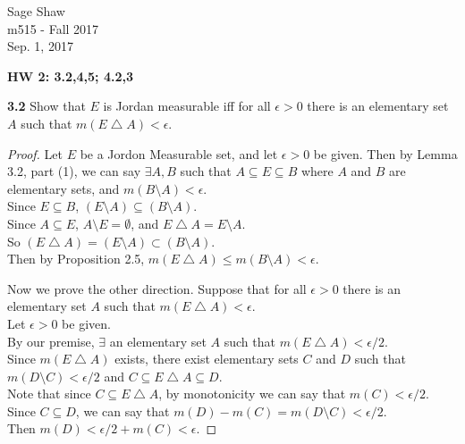 \documentclass[12pt]{article}
\begin{document}
	\thispagestyle{empty}
	
\begin{flushright}
	Sage Shaw \\
	m515 - Fall 2017 \\
	Sep. 1, 2017
\end{flushright}
	
{\large \textbf{HW 2: 3.2,4,5; 4.2,3}}\bigbreak

\hspace{-4 ex}\textbf{3.2} Show that $E$ is Jordan measurable iff for all $\epsilon>0$ there is an elementary set $A$ such that $m(E\bigtriangleup A)<\epsilon$. \bigbreak

	\begin{proof}
		Let $E$ be a Jordon Measurable set, and let $\epsilon >0$ be given. Then by Lemma 3.2, part (1), we can say $\exists A,B$ such that $A \subseteq E \subseteq B$ where $A$ and $B$ are elementary sets, and $m(B\setminus A)< \epsilon$. \\
		Since $E \subseteq B$, $(E \setminus A) \subseteq (B \setminus A)$. \\
		Since $A \subseteq E$, $A \setminus E = \emptyset$, and $E \bigtriangleup A = E \setminus A$. \\ 
		So $(E \bigtriangleup A) = (E \setminus A) \subset (B \setminus A)$.\\
		Then by Proposition 2.5, $m(E \bigtriangleup A) \leq m(B \setminus A) < \epsilon$.\bigbreak
		
		Now we prove the other direction. Suppose that for all $\epsilon>0$ there is an elementary set $A$ such that $m(E\bigtriangleup A)<\epsilon$.\\
		
		Let $\epsilon > 0$ be given. \\
		By our premise, $\exists $ an elementary set $A$ such that $m(E\bigtriangleup A)<\epsilon / 2$. \\
		Since $m(E \bigtriangleup A)$ exists, there exist elementary sets $C$ and $D$ such that \\
		$m(D \setminus C) < \epsilon/2$ and $C \subseteq E \bigtriangleup A \subseteq D$. \\
		Note that since $C \subseteq E \bigtriangleup A$, by monotonicity we can say that $m(C) < \epsilon/2$. \\
		Since $C \subseteq D$, we can say that $m(D)-m(C) = m(D \setminus C) < \epsilon/2$. \\
		Then $m(D) < \epsilon/2 + m(C) < \epsilon$. \bigbreak
		

\end{proof}
\end{document}
